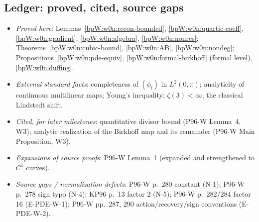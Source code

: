 \subsection{Ledger: proved, cited, source gaps}\label{bpW:w0n:ledger}

\begin{itemize}
\item \emph{Proved here}: Lemmas~\ref{bpW:w0n:recon-bounded}, \ref{bpW:w0n:quartic-coeff},
  \ref{bpW:w0n:gradient}, \ref{bpW:w0n:algebra}, \ref{bpW:w0n:nonres}; Theorems~\ref{bpW:w0n:cubic-bound},
  \ref{bpW:w0n:AB}, \ref{bpW:w0n:nondeg}; Propositions~\ref{bpW:w0n:pde-equiv}, \ref{bpW:w0n:formal-birkhoff}
  (formal level), \ref{bpW:w0n:duffing}.
\item \emph{External standard facts}: completeness of $(\phi_l)$ in $L^2(0,\pi)$; analyticity of continuous
  multilinear maps; Young's inequality; $\zeta(3)<\infty$; the classical Lindstedt shift.
\item \emph{Cited, for later milestones}: quantitative divisor bound (P96-W Lemma~4, W3); analytic realization of
  the Birkhoff map and its remainder (P96-W Main Proposition, W3).
\item \emph{Expansions of source proofs}: P96-W Lemma~1 (expanded and strengthened to $C^1$ curves).
\item \emph{Source gaps / normalization defects}: P96-W p.~280 constant (N-1); P96-W p.~278 sign typo (N-4); KP96 p.~13 factor $2$ (N-5); P96-W
  p.~282/284 factor $16$ (E-PDE-W-1); P96-W pp.~287, 290 action/recovery/sign conventions (E-PDE-W-2).
\end{itemize}
